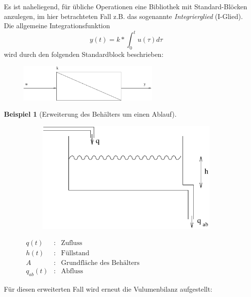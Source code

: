 \documentclass[12pt,a4paper,ngerman]{scrartcl}
\newtheorem{bsp}{Beispiel}[section] %
\begin{document}
Es ist naheliegend, für übliche Operationen eine Bibliothek mit Standard-Blöcken anzulegen, im hier betrachteten Fall z.B. das sogenannte \emph{Integrierglied} (I-Glied).
Die allgemeine Integrationsfunktion
\begin{equation*}
  y(t)=k*\int_0^t{u(\tau)d\tau}
\end{equation*}
wird durch den folgenden Standardblock beschrieben:
\begin{figure}[H]
  \includegraphics[width=7cm]{sysregel_iglied}
\end{figure}
\begin{bsp}[Erweiterung des Behälters um einen Ablauf]
\end{bsp}
\begin{figure}[H]
\begin{minipage}{0.4\linewidth}
\begin{figure}[H]
  \includegraphics[width=.9\linewidth]{sysregel_bsp_2}  
\end{figure}
\end{minipage}
\begin{minipage}{0.6\linewidth}
$\begin{array}{lll}
q(t)&:&\text{Zufluss}\\
h(t)&:&\text{Füllstand}\\
A&:&\text{Grundfläche des Behälters}\\
q_{ab}(t)&:&\text{Abfluss}
\end{array}$
\end{minipage}
\end{figure}
Für diesen erweiterten Fall wird erneut die Vulumenbilanz aufgestellt:
\end{document}
